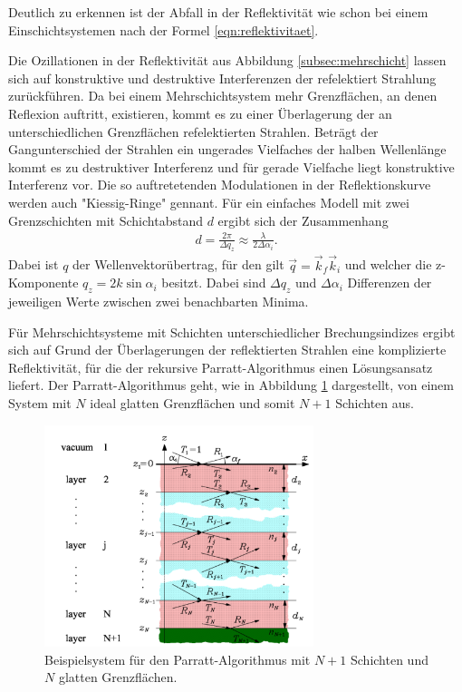 Deutlich zu erkennen ist der Abfall in der Reflektivität wie schon
bei einem Einschichtsystemen nach der Formel \eqref{eqn:reflektivitaet}.

Die Ozillationen in der Reflektivität aus Abbildung \ref{subsec:mehrschicht}
lassen sich auf konstruktive und destruktive Interferenzen
der refelektiert Strahlung zurückführen.
Da bei einem Mehrschichtsystem mehr
Grenzflächen, an denen Reflexion auftritt, existieren,
kommt es zu einer Überlagerung der an unterschiedlichen Grenzflächen
refelektierten Strahlen.
Beträgt der Gangunterschied der Strahlen
ein ungerades Vielfaches der halben Wellenlänge
kommt es zu destruktiver Interferenz und für gerade Vielfache
liegt konstruktive Interferenz vor.
Die so auftretetenden
Modulationen in der Reflektionskurve
werden auch "Kiessig-Ringe" gennant.
Für ein einfaches Modell mit zwei
Grenzschichten mit Schichtabstand $d$
ergibt sich der Zusammenhang
\begin{align}
  d = \frac{2\pi}{\Delta q_z} \approx \frac{\lambda}{2\Delta \alpha_i}. \label{eqn:schichtabstand}
\end{align}
Dabei ist $q$ der Wellenvektorübertrag, für den gilt
$\vec{q} = \vec{k}_f \vec{k}_i$ und welcher die z-Komponente $q_z=2k\sin \alpha_i$ besitzt.
Dabei sind $\Delta q_z$ und $\Delta\alpha_i$ Differenzen
der jeweiligen
Werte zwischen zwei benachbarten Minima. %

Für Mehrschichtsysteme mit Schichten
unterschiedlicher Brechungsindizes
ergibt sich auf Grund der Überlagerungen der reflektierten
Strahlen eine
komplizierte Reflektivität, für die der
rekursive Parratt-Algorithmus einen Lösungsansatz
liefert.
Der Parratt-Algorithmus geht, wie in Abbildung \ref{fig:parratt_syst} dargestellt, von einem System
mit $N$ ideal glatten Grenzflächen und somit $N+1$ Schichten aus.

\begin{figure}
  \centering
\includegraphics[width=0.7\textwidth]{bilder/mehrschicht_parratt.PNG}
\caption{Beispielsystem für den Parratt-Algorithmus
mit $N+1$ Schichten und $N$ glatten Grenzflächen.\cite{sample}}
\label{fig:parratt_syst}
\end{figure}

